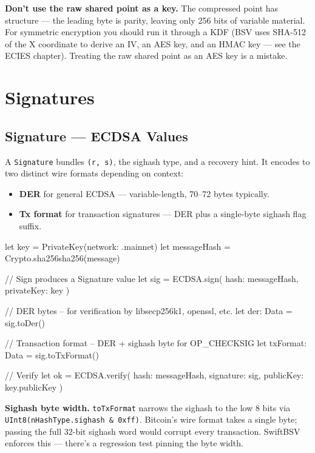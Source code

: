 \documentclass[a4paper, 11pt, openany]{book}
\begin{document}
\begin{notebox}
\textbf{Don't use the raw shared point as a key.} The compressed point has structure --- the leading byte is parity, leaving only 256 bits of variable material. For symmetric encryption you should run it through a KDF (BSV uses SHA-512 of the X coordinate to derive an IV, an AES key, and an HMAC key --- see the ECIES chapter). Treating the raw shared point as an AES key is a mistake.
\end{notebox}

\chapter{Signatures}

\section{Signature --- ECDSA Values}

A \texttt{Signature} bundles \texttt{(r, s)}, the sighash type, and a recovery hint. It encodes to two distinct wire formats depending on context:

\begin{itemize}
\item \textbf{DER} for general ECDSA --- variable-length, 70--72 bytes typically.
\item \textbf{Tx format} for transaction signatures --- DER plus a single-byte sighash flag suffix.
\end{itemize}

\begin{forthbox}
let key = PrivateKey(network: .mainnet)
let messageHash = Crypto.sha256sha256(message)

// Sign produces a Signature value
let sig = ECDSA.sign(
    hash: messageHash,
    privateKey: key
)

// DER bytes -- for verification by libsecp256k1, openssl, etc.
let der: Data = sig.toDer()

// Transaction format -- DER + sighash byte for OP_CHECKSIG
let txFormat: Data = sig.toTxFormat()

// Verify
let ok = ECDSA.verify(
    hash: messageHash,
    signature: sig,
    publicKey: key.publicKey
)
\end{forthbox}

\begin{notebox}
\textbf{Sighash byte width.} \texttt{toTxFormat} narrows the sighash to the low 8 bits via \texttt{UInt8(nHashType.sighash \& 0xff)}. Bitcoin's wire format takes a single byte; passing the full 32-bit sighash word would corrupt every transaction. SwiftBSV enforces this --- there's a regression test pinning the byte width.
\end{notebox}
\end{document}
